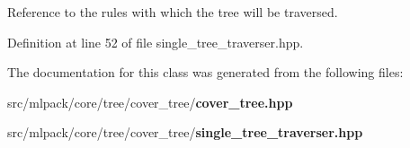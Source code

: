 Reference to the rules with which the tree will be traversed. 



Definition at line 52 of file single\-\_\-tree\-\_\-traverser.\-hpp.



The documentation for this class was generated from the following files\-:\begin{DoxyCompactItemize}
\item 
src/mlpack/core/tree/cover\-\_\-tree/{\bf cover\-\_\-tree.\-hpp}\item 
src/mlpack/core/tree/cover\-\_\-tree/{\bf single\-\_\-tree\-\_\-traverser.\-hpp}\end{DoxyCompactItemize}
